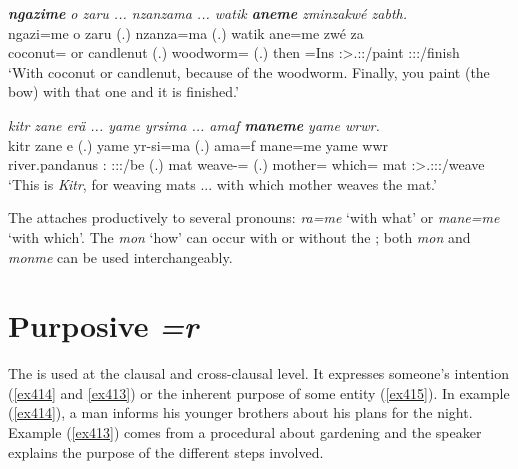 \begin{exe}
	\ex \emph{\textbf{ngazime} o zaru ... nzanzama ... watik \textbf{aneme} zminzakwé zabth.}\\
	\gll ngazi=me o zaru (.) nzanza=ma (.) watik ane=me zwé za\\
	coconut=\Ins{} or candlenut (.) woodworm=\Char{} (.) then \Dem=Ins{} \Ssg:\Sbj>\Tsg.\F:\Imp:\Ipfv/paint \Stsg:\Sbj:\Rpst:\Pfv/finish\\
	\trans `With coconut or candlenut, because of the woodworm. Finally, you paint (the bow) with that one and it is finished.'\\
	\label{ex410}
\end{exe}
\begin{exe}
	\ex \emph{kitr zane erä ... yame yrsima ... amaf \textbf{maneme} yame wrwr.}\\
	\gll kitr zane e (.) yame yr-si=ma (.) ama=f mane=me yame wwr\\
	river.pandanus \Dem:\Prox{} \Stpl:\Sbj:\Nonpast:\Ipfv/be (.) mat weave-\Nmlz=\Char{} (.) mother=\Erg{} which=\Ins{} mat \Stsg:\Sbj>\Tsg.\F:\Obj:\Nonpast:\Ipfv/weave\\ 
	\trans `This is \emph{Kitr}, for weaving mats ... with which mother weaves the mat.'
	\label{ex411}
\end{exe}

The  attaches productively to several  pronouns: \emph{ra=me} `with what' or \emph{mane=me} `with which'. The  \emph{mon} `how' can occur with or without the  ; both \emph{mon} and \emph{monme} can be used interchangeably.

\section{Purposive \emph{=r}} \label{purpcase}

The   is used at the clausal and cross-clausal level. It expresses someone's intention (\ref{ex414} and \ref{ex413}) or the inherent purpose of some entity (\ref{ex415}). In example (\ref{ex414}), a man informs his younger brothers about his plans for the night. Example (\ref{ex413}) comes from a procedural about gardening and the speaker explains the purpose of the different steps involved.

